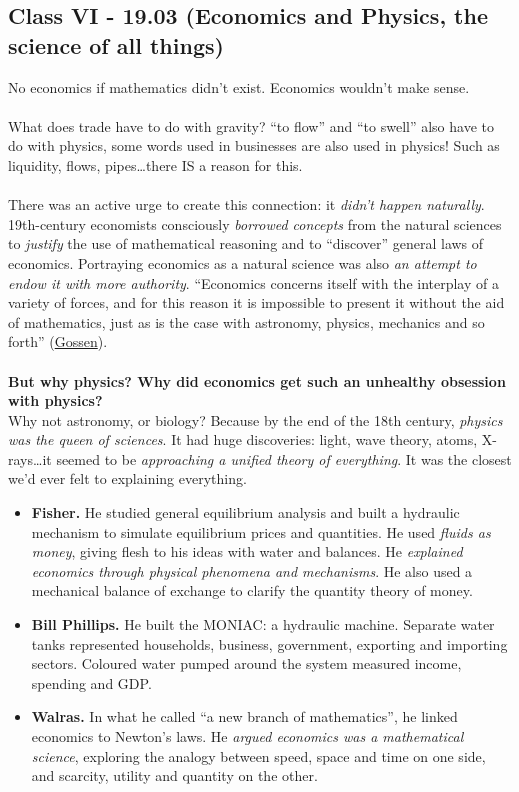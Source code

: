 \documentclass[a4paper,12pt]{article}
\begin{document}
\subsection*{Class VI - 19.03 (Economics and Physics, the science of all things)}
\noindent No economics if mathematics didn't exist. Economics wouldn't make sense. \\
\\
\noindent What does trade have to do with gravity? ``to flow'' and ``to swell'' also have to do with physics, some words used in businesses are also used in physics! Such as liquidity, flows, pipes\dots there IS a reason for this. \\
\\
\noindent There was an active urge to create this connection: it \emph{didn't happen naturally}. 19th-century economists consciously \emph{borrowed concepts} from the natural sciences to \emph{justify} the use of mathematical reasoning and to ``discover'' general laws of economics. Portraying economics as a natural science was also \emph{an attempt to endow it with more authority}. ``Economics concerns itself with the interplay of a variety of forces, and for this reason it is impossible to present it without the aid of mathematics, just as is the case with astronomy, physics, mechanics and so forth'' (\underline{Gossen}). \\
\\
\noindent \textbf{But why physics? Why did economics get such an unhealthy obsession with physics?} \\
\noindent Why not astronomy, or biology? Because by the end of the 18th century, \emph{physics was the queen of sciences}. It had huge discoveries: light, wave theory, atoms, X-rays\dots it seemed to be \emph{approaching a unified theory of everything}. It was the closest we'd ever felt to explaining everything.
\begin{itemize}
	\item \textbf{Fisher.} He studied general equilibrium analysis and built a hydraulic mechanism to simulate equilibrium prices and quantities. He used \emph{fluids as money}, giving flesh to his ideas with water and balances. He \emph{explained economics through physical phenomena and mechanisms}. He also used a mechanical balance of exchange to clarify the quantity theory of money.
	\item \textbf{Bill Phillips.} He built the MONIAC: a hydraulic machine. Separate water tanks represented households, business, government, exporting and importing sectors. Coloured water pumped around the system measured income, spending and GDP.
	\item \textbf{Walras.} In what he called ``a new branch of mathematics'', he linked economics to Newton's laws. He \emph{argued economics was a mathematical science}, exploring the analogy between speed, space and time on one side, and scarcity, utility and quantity on the other.
\end{itemize}
\end{document}
